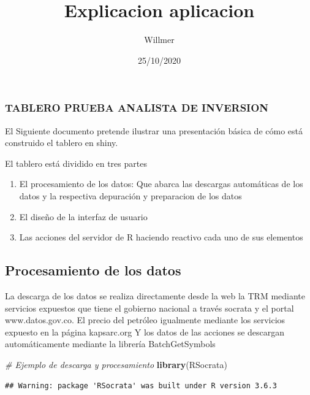 \documentclass[]{article}
\title{Explicacion aplicacion}
\author{Willmer}
\date{25/10/2020}
\newenvironment{Shaded}{\begin{snugshade}}{\end{snugshade}}
\newcommand{\CommentTok}[1]{\textcolor[rgb]{0.56,0.35,0.01}{\textit{#1}}}
\newcommand{\KeywordTok}[1]{\textcolor[rgb]{0.13,0.29,0.53}{\textbf{#1}}}
\newcommand{\NormalTok}[1]{#1}
\begin{document}
\maketitle

\hypertarget{tablero-prueba-analista-de-inversion}{%
\subsubsection{TABLERO PRUEBA ANALISTA DE
INVERSION}\label{tablero-prueba-analista-de-inversion}}

El Siguiente documento pretende ilustrar una presentación básica de cómo
está construido el tablero en shiny.

El tablero está dividido en tres partes

\begin{enumerate}
\def\labelenumi{\arabic{enumi}.}
\item
  El procesamiento de los datos: Que abarca las descargas automáticas de
  los datos y la respectiva depuración y preparacion de los datos
\item
  El diseño de la interfaz de usuario
\item
  Las acciones del servidor de R haciendo reactivo cada uno de sus
  elementos
\end{enumerate}

\hypertarget{procesamiento-de-los-datos}{%
\subsection{Procesamiento de los
datos}\label{procesamiento-de-los-datos}}

La descarga de los datos se realiza directamente desde la web la TRM
mediante servicios expuestos que tiene el gobierno nacional a través
socrata y el portal www.datos.gov.co. El precio del petróleo igualmente
mediante los servicios expuesto en la página kapsarc.org Y los datos de
las acciones se descargan automáticamente mediante la librería
BatchGetSymbols

\begin{Shaded}
\begin{Highlighting}[]
\CommentTok{# Ejemplo de descarga y procesamiento}
\KeywordTok{library}\NormalTok{(RSocrata)}
\end{Highlighting}
\end{Shaded}

\begin{verbatim}
## Warning: package 'RSocrata' was built under R version 3.6.3
\end{verbatim}
\end{document}

